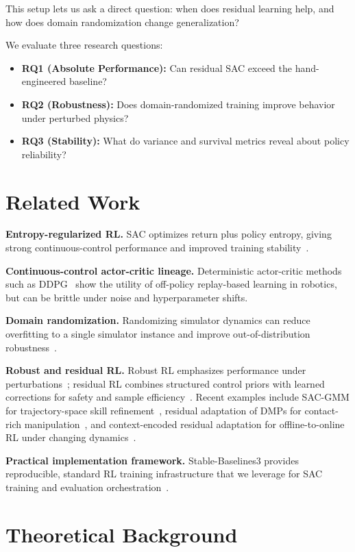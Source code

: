 \documentclass[10pt,twocolumn,letterpaper]{article}
\begin{document}
This setup lets us ask a direct question: when does residual learning help, and how does domain randomization change generalization?

We evaluate three research questions:
\begin{itemize}[leftmargin=*,noitemsep]
    \item \textbf{RQ1 (Absolute Performance):} Can residual SAC exceed the hand-engineered baseline?
    \item \textbf{RQ2 (Robustness):} Does domain-randomized training improve behavior under perturbed physics?
    \item \textbf{RQ3 (Stability):} What do variance and survival metrics reveal about policy reliability?
\end{itemize}

\section{Related Work}
\textbf{Entropy-regularized RL.}
SAC optimizes return plus policy entropy, giving strong continuous-control performance and improved training stability~\cite{haarnoja2018sac}.

\textbf{Continuous-control actor-critic lineage.}
Deterministic actor-critic methods such as DDPG~\cite{lillicrap2015ddpg} show the utility of off-policy replay-based learning in robotics, but can be brittle under noise and hyperparameter shifts.

\textbf{Domain randomization.}
Randomizing simulator dynamics can reduce overfitting to a single simulator instance and improve out-of-distribution robustness~\cite{tobin2017domainrand,peng2018sim2real}.

\textbf{Robust and residual RL.}
Robust RL emphasizes performance under perturbations~\cite{pinto2017robust}; residual RL combines structured control priors with learned corrections for safety and sample efficiency~\cite{johannink2019residualrl}. Recent examples include SAC-GMM for trajectory-space skill refinement~\cite{nematollahi2022sacgmm}, residual adaptation of DMPs for contact-rich manipulation~\cite{davchev2022rlfd}, and context-encoded residual adaptation for offline-to-online RL under changing dynamics~\cite{nakhaei2024relce}.

\textbf{Practical implementation framework.}
Stable-Baselines3 provides reproducible, standard RL training infrastructure that we leverage for SAC training and evaluation orchestration~\cite{raffin2021sb3}.

\section{Theoretical Background}
\end{document}
